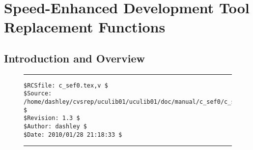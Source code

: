 
\chapter[Speed-Enhanced Development Tool Replacement Functions]
        {Speed-Enhanced Development Tool Replacement Functions}


\label{csef0}

\section{Introduction and Overview}
\label{csef0:siov0}


\noindent\begin{figure}[!b]
\noindent\rule[-0.25in]{\textwidth}{1pt}
\begin{tiny}
\begin{verbatim}
$RCSfile: c_sef0.tex,v $
$Source: /home/dashley/cvsrep/uculib01/uculib01/doc/manual/c_sef0/c_sef0.tex,v $
$Revision: 1.3 $
$Author: dashley $
$Date: 2010/01/28 21:18:33 $
\end{verbatim}
\end{tiny}
\noindent\rule[0.25in]{\textwidth}{1pt}
\end{figure}

%
%

